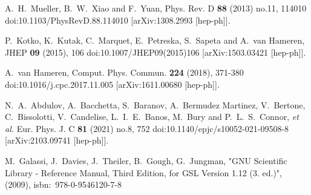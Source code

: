 A.~H.~Mueller, B.~W.~Xiao and F.~Yuan,
Phys. Rev. D \textbf{88} (2013) no.11, 114010
doi:10.1103/PhysRevD.88.114010
[arXiv:1308.2993 [hep-ph]].

P.~Kotko, K.~Kutak, C.~Marquet, E.~Petreska, S.~Sapeta and A.~van Hameren,
JHEP \textbf{09} (2015), 106
doi:10.1007/JHEP09(2015)106
[arXiv:1503.03421 [hep-ph]].

A.~van Hameren,
Comput. Phys. Commun. \textbf{224} (2018), 371-380
doi:10.1016/j.cpc.2017.11.005
[arXiv:1611.00680 [hep-ph]].

N.~A.~Abdulov, A.~Bacchetta, S.~Baranov, A.~Bermudez Martinez, V.~Bertone, C.~Bissolotti, V.~Candelise, L.~I.~E.~Banos, M.~Bury and P.~L.~S.~Connor, \textit{et al.}
Eur. Phys. J. C \textbf{81} (2021) no.8, 752
doi:10.1140/epjc/s10052-021-09508-8
[arXiv:2103.09741 [hep-ph]].

M.~Galassi, J.~Davies, J.~Theiler, B.~Gough, G.~Jungman,
"GNU Scientific Library - Reference Manual, Third Edition, for GSL Version 1.12 (3. ed.)",
(2009),
isbn:~978-0-9546120-7-8